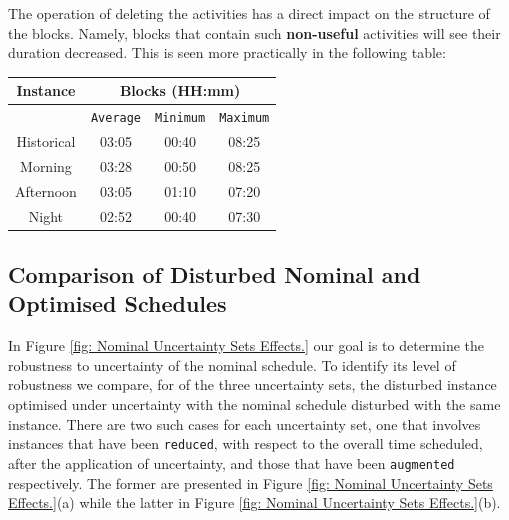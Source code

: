 \vspace{\baselineskip}
\noindent
The operation of deleting the activities has a direct impact on the structure of the blocks. Namely, blocks that contain such \textbf{non-useful} activities will see their duration decreased. This is seen more practically in the following table:


\begin{table}[ht]
\small
    \centering 
    \begin{tabular}{|c|c|c|c|}
        \hline
        \textbf{Instance} & \multicolumn{3}{|c|}{ \textbf{Blocks (HH:mm)}}  \\
        \hline
         & \texttt{Average} &  \texttt{Minimum} & \texttt{Maximum} \\
        \hline
        Historical & 03:05 & 00:40 & 08:25 \\
        \hline
        Morning & 03:28 & 00:50 & 08:25 \\
        \hline
        Afternoon & 03:05 & 01:10 & 07:20 \\
        \hline
        Night & 02:52 & 00:40 & 07:30 \\
        \hline
    \end{tabular}%
    \medbreak
\end{table}


\subsection{Comparison of Disturbed Nominal and Optimised Schedules}
\label{subsection: Appendix Comparison of Disturbed Nominal and Optimised Schedules}
In Figure \ref{fig: Nominal Uncertainty Sets Effects.} our goal is to determine the robustness to uncertainty of the nominal schedule. To identify its level of robustness we compare, for of the three uncertainty sets, the disturbed instance optimised under uncertainty with the nominal schedule disturbed with the same instance. There are two such cases for each uncertainty set, one that involves instances that have been \texttt{reduced}, with respect to the overall time scheduled, after the application of uncertainty, and those that have been \texttt{augmented} respectively. The former are presented in Figure \ref{fig: Nominal Uncertainty Sets Effects.}(a) while the latter in Figure \ref{fig: Nominal Uncertainty Sets Effects.}(b). 

